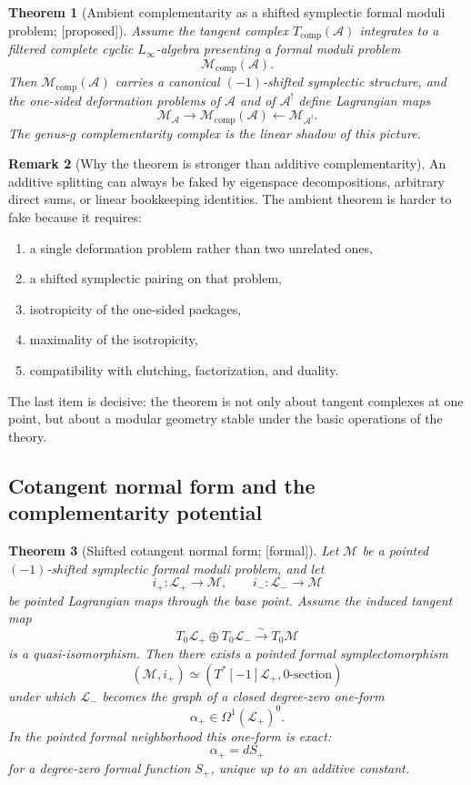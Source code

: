\documentclass[11pt,oneside]{memoir}
\numberwithin{equation}{chapter}
\newtheorem{theorem}{Theorem}[chapter]
\theoremstyle{definition}
\newtheorem{remark}[theorem]{Remark}
\newcommand{\ClaimStatusProvedHere}{\textnormal{[formal]}}
\newcommand{\ClaimStatusConjectured}{\textnormal{[proposed]}}
\newcommand{\cA}{\mathcal A}
\begin{document}
\begin{theorem}[Ambient complementarity as a shifted symplectic formal moduli problem; \ClaimStatusConjectured]
\label{thm:nms-ambient-complementarity-fmp}
Assume the tangent complex $T_{\mathrm{comp}}(\cA)$ integrates to a filtered complete cyclic $L_\infty$-algebra presenting a formal moduli problem
\[
\mathcal M_{\mathrm{comp}}(\cA).
\]
Then $\mathcal M_{\mathrm{comp}}(\cA)$ carries a canonical $(-1)$-shifted symplectic structure, and the one-sided deformation problems of $\cA$ and of $\cA^!$ define Lagrangian maps
\[
\mathcal M_{\cA}\longrightarrow \mathcal M_{\mathrm{comp}}(\cA)
\longleftarrow \mathcal M_{\cA^!}.
\]
The genus-$g$ complementarity complex is the linear shadow of this picture.
\end{theorem}

\begin{remark}[Why the theorem is stronger than additive complementarity]
\label{rem:nms-stronger-than-additive}
An additive splitting can always be faked by eigenspace decompositions, arbitrary direct sums, or linear bookkeeping identities.  The ambient theorem is harder to fake because it requires:
\begin{enumerate}[label=\textup{(\roman*)}]
\item a single deformation problem rather than two unrelated ones,
\item a shifted symplectic pairing on that problem,
\item isotropicity of the one-sided packages,
\item maximality of the isotropicity,
\item compatibility with clutching, factorization, and duality.
\end{enumerate}
The last item is decisive: the theorem is not only about tangent complexes at one point, but about a modular geometry stable under the basic operations of the theory.
\end{remark}

\subsection{Cotangent normal form and the complementarity potential}
\label{subsec:nms-cotangent-normal-form}

\begin{theorem}[Shifted cotangent normal form; \ClaimStatusProvedHere]
\label{thm:nms-cotangent-normal-form}
Let $\mathcal M$ be a pointed $(-1)$-shifted symplectic formal moduli problem, and let
\[
i_+\colon \mathcal L_+\to \mathcal M,
\qquad
 i_-\colon \mathcal L_-\to \mathcal M
\]
be pointed Lagrangian maps through the base point.  Assume the induced tangent map
\[
T_0\mathcal L_+\oplus T_0\mathcal L_- \xrightarrow{\sim} T_0\mathcal M
\]
is a quasi-isomorphism.  Then there exists a pointed formal symplectomorphism
\[
(\mathcal M,i_+)\simeq (T^*[-1]\mathcal L_+,0\text{-section})
\]
under which $\mathcal L_-$ becomes the graph of a closed degree-zero one-form
\[
\alpha_+\in \Omega^1(\mathcal L_+)^0.
\]
In the pointed formal neighborhood this one-form is exact:
\[
\alpha_+=dS_+
\]
for a degree-zero formal function $S_+$, unique up to an additive constant.
\end{theorem}
\end{document}

